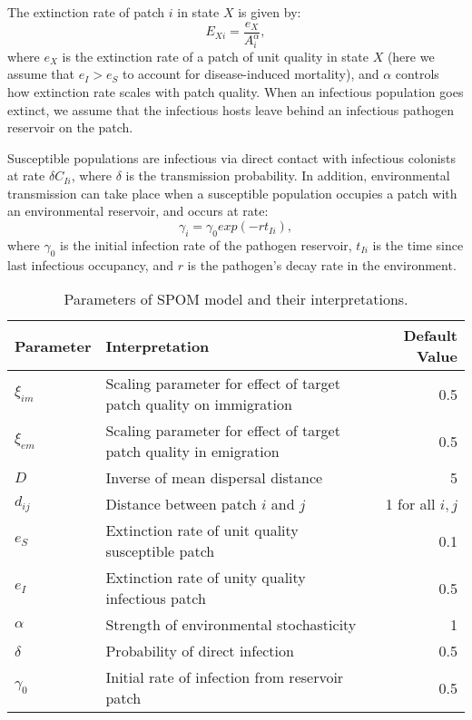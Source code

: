 \documentclass{svjour3}
\begin{document}
The extinction rate of patch $i$ in state $X$ is given by:
\begin{equation}
E_{Xi}=\frac{e_X}{A_i^\alpha},
\end{equation}
where $e_X$ is the extinction rate of a patch of unit quality in state $X$ (here we assume that $e_I>e_S$ to account for disease-induced mortality), and $\alpha$ controls how extinction rate scales with patch quality.  When an infectious population goes extinct, we assume that the infectious hosts leave behind an infectious pathogen reservoir on the patch.  

Susceptible populations are infectious via direct contact with infectious colonists at rate $\delta C_{Ii}$, where $\delta$ is the transmission probability.  In addition, environmental transmission can take place when a susceptible population occupies a patch with an environmental reservoir, and occurs at rate:
\begin{equation}
\gamma_i=\gamma_0exp(-rt_{Ii}),
\end{equation}
where $\gamma_0$ is the initial infection rate of the pathogen reservoir, $t_{Ii}$ is the time since last infectious occupancy, and $r$ is the pathogen's decay rate in the environment.


\begin{table}[h!]
\label{parameters}      
\caption{Parameters of SPOM model and their interpretations.}
\begin{tabular}{l p{8.5cm} r}
Parameter & Interpretation &  Default Value\\
\hline
$\xi_{im}$ & Scaling parameter for effect of target patch quality on immigration & 0.5\\
$\xi_{em}$ & Scaling parameter for effect of target patch quality in emigration & 0.5\\
$D$& Inverse of mean dispersal distance & 5\\
$d_{ij}$ & Distance between patch $i$ and $j$ & 1 for all $i,j$\\
\hline
$e_S$ & Extinction rate of unit quality susceptible patch & 0.1\\
$e_I$ & Extinction rate of unity quality infectious patch & 0.5\\
$\alpha$ & Strength of environmental stochasticity & 1\\
\hline
$\delta$ & Probability of direct infection & 0.5\\
$\gamma_0$ & Initial rate of infection from reservoir patch & 0.5
\end{tabular}
\end{table}
\end{document}
